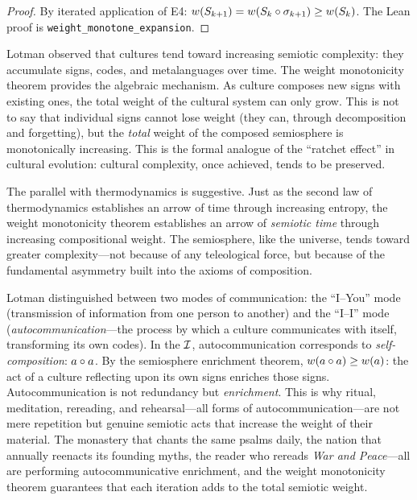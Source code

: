 \begin{proof}
By iterated application of E4: $w(S_{k+1}) = w(S_k \circ \sigma_{k+1}) \geq w(S_k)$. The Lean proof is \texttt{weight\_monotone\_expansion}.
\end{proof}

\begin{interpretation}
Lotman observed that cultures tend toward increasing semiotic complexity: they accumulate signs, codes, and metalanguages over time. The weight monotonicity theorem provides the algebraic mechanism. As culture composes new signs with existing ones, the total weight of the cultural system can only grow. This is not to say that individual signs cannot lose weight (they can, through decomposition and forgetting), but the \emph{total} weight of the composed semiosphere is monotonically increasing. This is the formal analogue of the ``ratchet effect'' in cultural evolution: cultural complexity, once achieved, tends to be preserved.

The parallel with thermodynamics is suggestive. Just as the second law of thermodynamics establishes an arrow of time through increasing entropy, the weight monotonicity theorem establishes an arrow of \emph{semiotic time} through increasing compositional weight. The semiosphere, like the universe, tends toward greater complexity---not because of any teleological force, but because of the fundamental asymmetry built into the axioms of composition.
\end{interpretation}

\begin{remark}
Lotman distinguished between two modes of communication: the ``I--You'' mode (transmission of information from one person to another) and the ``I--I'' mode (\emph{autocommunication}---the process by which a culture communicates with itself, transforming its own codes). In the $\mathcal{I}$, autocommunication corresponds to \emph{self-composition}: $a \circ a$. By the semiosphere enrichment theorem, $w(a \circ a) \geq w(a)$: the act of a culture reflecting upon its own signs enriches those signs. Autocommunication is not redundancy but \emph{enrichment}. This is why ritual, meditation, rereading, and rehearsal---all forms of autocommunication---are not mere repetition but genuine semiotic acts that increase the weight of their material. The monastery that chants the same psalms daily, the nation that annually reenacts its founding myths, the reader who rereads \textit{War and Peace}---all are performing autocommunicative enrichment, and the weight monotonicity theorem guarantees that each iteration adds to the total semiotic weight.
\end{remark}

